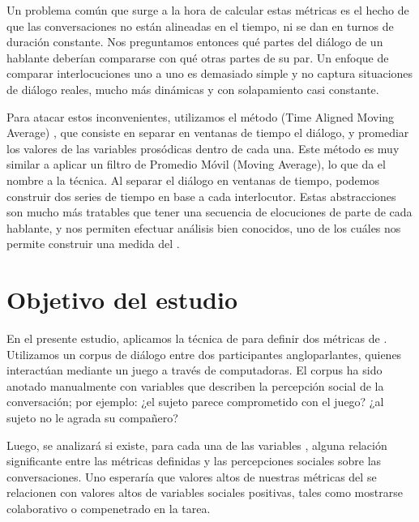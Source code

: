 Un problema común que surge a la hora de calcular estas métricas es el hecho de que las conversaciones no están alineadas en el tiempo, ni se dan en turnos de duración constante. Nos preguntamos entonces qué partes del diálogo de un hablante deberían compararse con qué otras partes de su par. Un enfoque de comparar interlocuciones uno a uno es demasiado simple y no captura situaciones de diálogo reales, mucho más dinámicas y con solapamiento casi constante.

Para atacar estos inconvenientes, utilizamos el método \TAMA(Time Aligned Moving Average) \cite{KOU2008}, que consiste en separar en ventanas de tiempo el diálogo, y promediar los valores de las variables prosódicas dentro de cada una. Este método es muy similar a aplicar un filtro de Promedio Móvil (Moving Average), lo que da el nombre a la técnica. Al separar el diálogo en ventanas de tiempo, podemos construir dos series de tiempo en base a cada interlocutor. Estas abstracciones son mucho más tratables que tener una secuencia de elocuciones de parte de cada hablante, y nos permiten efectuar análisis bien conocidos, uno de los cuáles nos permite construir una medida del \entrainment.

\section{Objetivo del estudio}

En el presente estudio, aplicamos la técnica de \TAMA para definir dos métricas de \entrainment. Utilizamos un corpus de diálogo entre dos participantes angloparlantes, quienes interactúan mediante un juego a través de computadoras. El corpus ha sido anotado manualmente con variables que describen la percepción social de la conversación; por ejemplo: ¿el sujeto parece comprometido con el juego? ¿al sujeto no le agrada su compañero?

Luego, se analizará si existe, para cada una de las variables \ap,  alguna relación significante entre las métricas definidas y las percepciones sociales sobre las conversaciones. Uno esperaría que valores altos de nuestras métricas del \entrainment se relacionen con valores altos de variables sociales positivas, tales como mostrarse colaborativo o compenetrado en la tarea.
